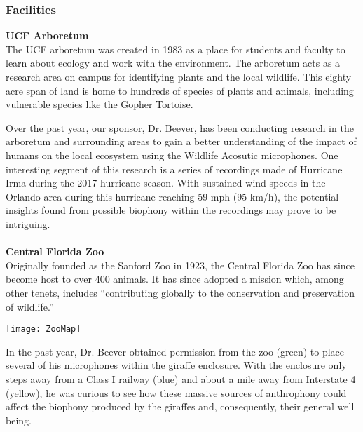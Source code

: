 \subsubsection{Facilities}
\textbf{UCF Arboretum}\\
The UCF arboretum was created in 1983 as a place for students and faculty to learn about ecology and work with the environment. The arboretum acts as a research area on campus for identifying plants and the local wildlife\cite{ucfarboretum}. This eighty acre span of land is home to hundreds of species of plants and animals, including vulnerable species like the Gopher Tortoise.\cite{pegasus}\par
Over the past year, our sponsor, Dr. Beever, has been conducting research in the arboretum and surrounding areas to gain a better understanding of the impact of humans on the local ecosystem using the Wildlife Acosutic microphones. One interesting segment of this research is a series of recordings made of Hurricane Irma during the 2017 hurricane season. With sustained wind speeds in the Orlando area during this hurricane reaching 59 mph (95 km/h),\cite{irmaspeed} the potential insights found from possible biophony within the recordings may prove to be intriguing.\\\\
\textbf{Central Florida Zoo}\\
Originally founded as the Sanford Zoo in 1923, the Central Florida Zoo has since become host to over 400 animals. It has since adopted a mission which, among other tenets, includes ``contributing globally to the conservation and preservation of wildlife.''\cite{aboutzoo}\par
\begin{center}
	\texttt{[image: ZooMap]}
\end{center}
In the past year, Dr. Beever obtained permission from the zoo (green) to place several of his microphones within the giraffe enclosure. With the enclosure only steps away from a Class I railway (blue) and about a mile away from Interstate 4 (yellow), he was curious to see how these massive sources of anthrophony could affect the biophony produced by the giraffes and, consequently, their general well being.
